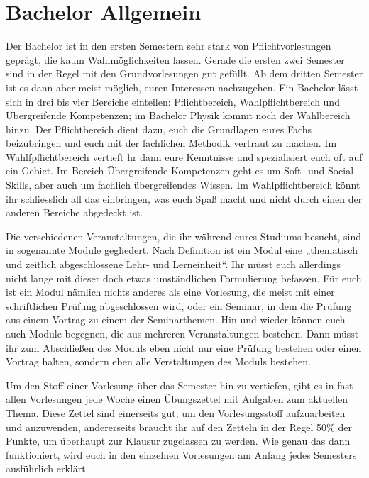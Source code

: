 \section{Bachelor Allgemein}
Der Bachelor ist in den ersten Semestern sehr stark von Pflichtvorlesungen
geprägt, die kaum Wahlmöglichkeiten lassen. Gerade die ersten zwei Semester
sind in der Regel mit den Grundvorlesungen gut gefüllt. Ab dem dritten Semester
ist es dann aber meist möglich, euren Interessen nachzugehen. 
Ein Bachelor lässt sich in drei bis vier Bereiche einteilen: Pflichtbereich,
Wahlpflichtbereich und Übergreifende Kompetenzen; im Bachelor Physik kommt noch
der Wahlbereich hinzu.
Der Pflichtbereich dient dazu, euch die Grundlagen eures Fachs beizubringen und
euch mit der fachlichen Methodik vertraut zu machen.  Im Wahlfpflichtbereich
vertieft hr dann eure Kenntnisse und spezialisiert euch oft auf ein Gebiet. Im
Bereich Übergreifende Kompetenzen geht es um Soft- und Social Skills, aber auch
um fachlich übergreifendes Wissen.  Im Wahlpflichtbereich könnt ihr
schliesslich all das einbringen, was euch Spaß macht und nicht durch einen der
anderen Bereiche abgedeckt ist.

Die verschiedenen Veranstaltungen, die ihr während eures Studiums besucht, sind in sogenannte Module gegliedert. Nach Definition ist ein Modul eine „thematisch und zeitlich abgeschlossene Lehr- und Lerneinheit“. Ihr müsst euch allerdings nicht lange mit dieser doch etwas umständlichen Formulierung befassen. Für euch ist ein Modul nämlich nichts anderes als eine Vorlesung, die meist mit einer schriftlichen Prüfung abgeschlossen wird, oder ein Seminar, in dem die Prüfung aus einem Vortrag zu einem der Seminarthemen. Hin und wieder können euch auch Module begegnen, die aus mehreren Veranstaltungen bestehen. Dann müsst ihr zum Abschließen des Moduls eben nicht nur eine Prüfung bestehen oder einen Vortrag halten, sondern eben alle Verstaltungen des Moduls bestehen. 

Um den Stoff einer Vorlesung über das Semester hin zu vertiefen, gibt es in fast allen Vorlesungen jede Woche einen Übungszettel mit Aufgaben zum aktuellen Thema. Diese Zettel sind einerseits gut, um den Vorlesungsstoff aufzuarbeiten und anzuwenden, andererseits braucht ihr auf den Zetteln in der Regel 50\% der Punkte, um überhaupt zur Klausur zugelassen zu werden. Wie genau das dann funktioniert, wird euch in den einzelnen Vorlesungen am Anfang jedes Semesters ausführlich erklärt. 


